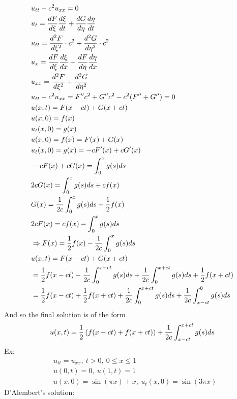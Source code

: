 \documentclass[11pt, fleqn]{article}
\begin{document}
\begin{align*}
    &u_{tt}-c^2u_{xx}=0\\
    &u_t=\frac{dF}{d\xi}\frac{d\xi}{dt}+\frac{dG}{d\eta}\frac{d\eta}{dt}\\
    &u_{tt}=\frac{d^2F}{d\xi^2}\cdot c^2+\frac{d^2G}{d\eta^2}\cdot c^2\\
    &u_x=\frac{dF}{d\xi}\frac{d\xi}{dx}+\frac{dF}{d\eta}\frac{d\eta}{dx}\\
    &u_{xx}=\frac{d^2F}{d\xi^2}+\frac{d^2G}{d\eta^2}\\
    &u_{tt}-c^2u_{xx}=F''c^2+G''c^2-c^2(F''+G'')=0\\
    &u(x,t)=F(x-ct)+G(x+ct)\\
    &u(x,0)=f(x)\\
    &u_t(x,0)=g(x)\\
    &u(x,0)=f(x)=F(x)+G(x)\\
    &u_t(x,0)=g(x)=-cF'(x)+cG'(x)\\
    &-cF(x)+cG(x)=\int_0^x g(s)ds\\
    &2cG(x)=\int_0^xg(s)ds+cf(x)\\
    &G(x)=\frac{1}{2c}\int_0^xg(s)ds+\frac{1}{2}f(x)\\
    &2cF(x)=cf(x)-\int_0^x g(s)ds\\
    &\Rightarrow F(x)=\frac{1}{2}f(x)-\frac{1}{2c}\int_0^x g(s)ds\\
    &u(x,t)=F(x-ct)+G(x+ct)\\
    &=\frac{1}{2}f(x-ct)-\frac{1}{2c}\int_0^{x-ct}g(s)ds+\frac{1}{2c}\int_0^{x+ct}g(s)ds+\frac{1}{2}f(x+ct)\\
    &=\frac{1}{2}f(x-ct)+\frac{1}{2}f(x+ct)+\frac{1}{2c}\int_0^{x+ct}g(s)ds+\frac{1}{2c}\int_{x-ct}^0 g(s)ds
\end{align*}
And so the final solution is of the form
$$u(x,t)=\frac{1}{2}\left( f(x-ct)+f(x+ct) \right)+\frac{1}{2c}\int_{x-ct}^{x+ct}g(s)ds$$
Ex:
\begin{align*}
    &u_{tt}=u_{xx},\ t>0,\ 0\leq x\leq 1\\
    &u(0,t)=0,\ u(1,t)=1\\
    &u(x,0)=\sin(\pi x)+x,\ u_t(x,0)=\sin(3\pi x)
\end{align*}
D'Alembert's solution:
\end{document}
